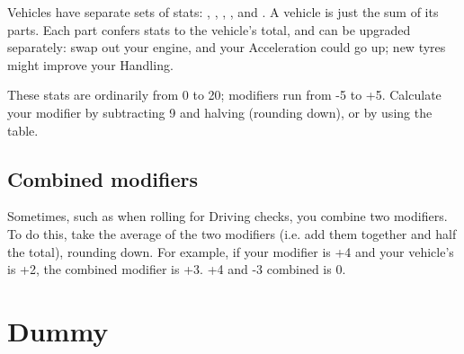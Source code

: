 \documentclass[10pt, a4paper, twocolumn]{article}
\begin{document}
Vehicles have separate sets of stats: , ,
, ,  and . A vehicle is just
the sum of its parts. Each part confers stats to the vehicle's total, and can be
upgraded separately: swap out your engine, and your Acceleration could go up;
new tyres might improve your Handling.

These stats are ordinarily from 0 to 20; modifiers
run from -5 to +5. Calculate your modifier by subtracting 9 and halving
(rounding down), or by using the table.

\subsection{Combined modifiers}
Sometimes, such as when rolling for Driving checks, you combine two
modifiers. To do this, take the average of the two modifiers (i.e. add them
together and half the total), rounding down. For example, if your 
modifier is +4 and your vehicle's  is +2, the combined modifier is +3. 
+4 and -3 combined is 0.


\section{Dummy}
\lipsum{}
\end{document}
